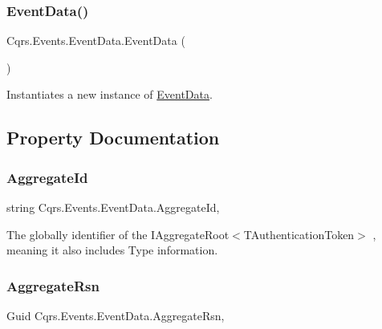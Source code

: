 \subsubsection{\texorpdfstring{Event\+Data()}{EventData()}}
{\footnotesize\ttfamily Cqrs.\+Events.\+Event\+Data.\+Event\+Data (\begin{DoxyParamCaption}{ }\end{DoxyParamCaption})}



Instantiates a new instance of \hyperlink{classCqrs_1_1Events_1_1EventData}{Event\+Data}. 



\subsection{Property Documentation}
\mbox{\label{classCqrs_1_1Events_1_1EventData_a0079e7f2307d3fc54063317edb71ffc2_a0079e7f2307d3fc54063317edb71ffc2}} 
\subsubsection{\texorpdfstring{Aggregate\+Id}{AggregateId}}
{\footnotesize\ttfamily string Cqrs.\+Events.\+Event\+Data.\+Aggregate\+Id\hspace{0.3cm}{\ttfamily [get]}, {\ttfamily [set]}}



The globally identifier of the I\+Aggregate\+Root$<$\+T\+Authentication\+Token$>$ , meaning it also includes Type information. 

\mbox{\label{classCqrs_1_1Events_1_1EventData_a562ea218ea8f517a980452097239c774_a562ea218ea8f517a980452097239c774}} 
\subsubsection{\texorpdfstring{Aggregate\+Rsn}{AggregateRsn}}
{\footnotesize\ttfamily Guid Cqrs.\+Events.\+Event\+Data.\+Aggregate\+Rsn\hspace{0.3cm}{\ttfamily [get]}, {\ttfamily [set]}}



